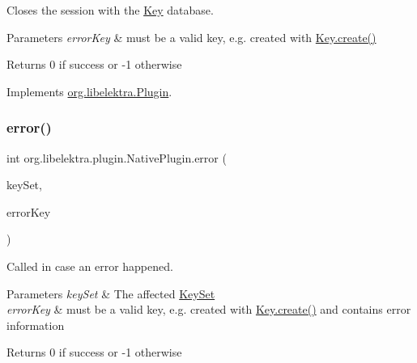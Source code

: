 Closes the session with the \hyperlink{classorg_1_1libelektra_1_1Key}{Key} database. 


\begin{DoxyParams}{Parameters}
{\em error\+Key} & must be a valid key, e.\+g. created with \hyperlink{classorg_1_1libelektra_1_1Key_af407cf43625618af4e7fb2576037fcfc}{Key.\+create()} \\
\hline
\end{DoxyParams}
\begin{DoxyReturn}{Returns}
0 if success or -\/1 otherwise 
\end{DoxyReturn}


Implements \hyperlink{interfaceorg_1_1libelektra_1_1Plugin_aa5d4abf6ffd0d477d6972b13bed05d41}{org.\+libelektra.\+Plugin}.

\mbox{\label{classorg_1_1libelektra_1_1plugin_1_1NativePlugin_a54c2753b1d17e14be39526a6ff02e34d}} 
\subsubsection{\texorpdfstring{error()}{error()}}
{\footnotesize\ttfamily int org.\+libelektra.\+plugin.\+Native\+Plugin.\+error (\begin{DoxyParamCaption}\item[{\hyperlink{classorg_1_1libelektra_1_1KeySet}{Key\+Set}}]{key\+Set,  }\item[{\hyperlink{classorg_1_1libelektra_1_1Key}{Key}}]{error\+Key }\end{DoxyParamCaption})\hspace{0.3cm}{\ttfamily [inline]}}



Called in case an error happened. 


\begin{DoxyParams}{Parameters}
{\em key\+Set} & The affected \hyperlink{classorg_1_1libelektra_1_1KeySet}{Key\+Set} \\
\hline
{\em error\+Key} & must be a valid key, e.\+g. created with \hyperlink{classorg_1_1libelektra_1_1Key_af407cf43625618af4e7fb2576037fcfc}{Key.\+create()} and contains error information \\
\hline
\end{DoxyParams}
\begin{DoxyReturn}{Returns}
0 if success or -\/1 otherwise 
\end{DoxyReturn}


